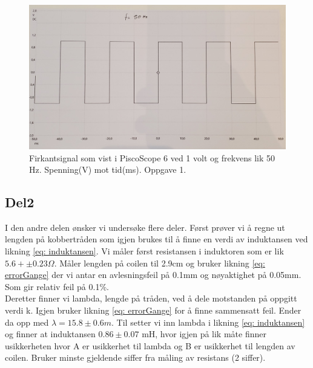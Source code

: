 \documentclass[norsk,a4paper,12pt]{article}
\begin{document}
\begin{figure}[htbp]
    \centering
    \includegraphics[width=1\textwidth]{Figs/firkantsignal.jpg}
    \caption{Firkantsignal som vist i PiscoScope 6 ved 1 volt og frekvens lik 50 Hz. Spenning(V) mot tid(ms). Oppgave 1. }
    \label{fig:sq_wave}
\end{figure}



\subsection{Del2}
I den andre delen ønsker vi undersøke flere deler. Først prøver vi å regne ut lengden på kobbertråden som igjen brukes til å finne en verdi av induktansen ved likning \ref{eq: induktansen}. Vi måler først resistansen i induktoren som er lik $5.6 + \pm 0.23 \Omega$. Måler lengden på coilen til 2.9cm og bruker likning \ref{eq: errorGange} der vi antar en avlesningsfeil på 0.1mm og nøyaktighet på 0.05mm. Som gir relativ feil på 0.1\%. \\ 

Deretter finner vi lambda, lengde på tråden, ved å dele motstanden på oppgitt verdi k. Igjen bruker likning \ref{eq: errorGange} for å finne sammensatt feil. Ender da opp med $\lambda = 15.8 \pm 0.6 m$. Til setter vi inn lambda i likning \ref{eq: induktansen} og finner at induktansen $0.86 \pm 0.07$ mH, hvor igjen på lik måte finner usikkerheten hvor A er usikkerhet til lambda og B er usikkerhet til lengden av coilen. Bruker minste gjeldende siffer fra måling av resistans (2 siffer).\\
\end{document}
